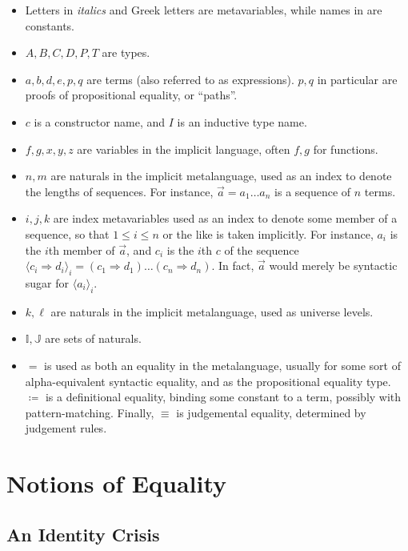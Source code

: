 \documentclass{report}
\newcommand{\const}[1]{\text{#1}}
\begin{document}
\begin{itemize}
    \item Letters in \textit{italics} and Greek letters are metavariables, while names in \const{roman} are constants. %
    \item $A, B, C, D, P, T$ are types.
    \item $a, b, d, e, p, q$ are terms (also referred to as expressions). $p, q$ in particular are proofs of propositional equality, or ``paths''.
    \item $c$ is a constructor name, and $I$ is an inductive type name.
    \item $f, g, x, y, z$ are variables in the implicit language, often $f, g$ for functions.
    \item $n, m$ are naturals in the implicit metalanguage, used as an index to denote the lengths of sequences. For instance, $\Vec{a} = a_1 \dots a_n$ is a sequence of $n$ terms.
    \item $i, j, k$ are index metavariables used as an index to denote some member of a sequence, so that $1 \leq i \leq n$ or the like is taken implicitly. For instance, $a_i$ is the $i$th member of $\Vec{a}$, and $c_i$ is the $i$th $c$ of the sequence $\langle c_i \Rightarrow d_i \rangle_i = (c_1 \Rightarrow d_1) \dots (c_n \Rightarrow d_n)$. In fact, $\Vec{a}$ would merely be syntactic sugar for $\langle a_i \rangle_i$.
    \item $k, \ell$ are naturals in the implicit metalanguage, used as universe levels.
    \item $\mathbb{I}, \mathbb{J}$ are sets of naturals.
    \item $=$ is used as both an equality in the metalanguage, usually for some sort of alpha-equivalent syntactic equality, and as the propositional equality type. $\coloneqq$ is a definitional equality, binding some constant to a term, possibly with pattern-matching. Finally, $\equiv$ is judgemental equality, determined by judgement rules.
\end{itemize}


\chapter{Notions of Equality}
\section{An Identity Crisis}
\end{document}
